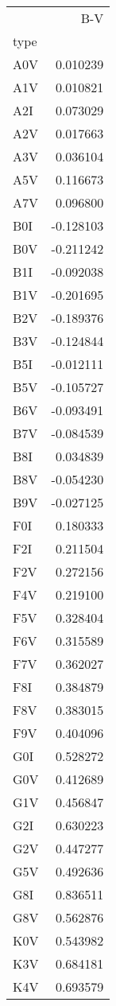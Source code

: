 \begin{tabular}{lr}
\toprule
{} &       B-V \\
type &           \\
\midrule
A0V  &  0.010239 \\
A1V  &  0.010821 \\
A2I  &  0.073029 \\
A2V  &  0.017663 \\
A3V  &  0.036104 \\
A5V  &  0.116673 \\
A7V  &  0.096800 \\
B0I  & -0.128103 \\
B0V  & -0.211242 \\
B1I  & -0.092038 \\
B1V  & -0.201695 \\
B2V  & -0.189376 \\
B3V  & -0.124844 \\
B5I  & -0.012111 \\
B5V  & -0.105727 \\
B6V  & -0.093491 \\
B7V  & -0.084539 \\
B8I  &  0.034839 \\
B8V  & -0.054230 \\
B9V  & -0.027125 \\
F0I  &  0.180333 \\
F2I  &  0.211504 \\
F2V  &  0.272156 \\
F4V  &  0.219100 \\
F5V  &  0.328404 \\
F6V  &  0.315589 \\
F7V  &  0.362027 \\
F8I  &  0.384879 \\
F8V  &  0.383015 \\
F9V  &  0.404096 \\
G0I  &  0.528272 \\
G0V  &  0.412689 \\
G1V  &  0.456847 \\
G2I  &  0.630223 \\
G2V  &  0.447277 \\
G5V  &  0.492636 \\
G8I  &  0.836511 \\
G8V  &  0.562876 \\
K0V  &  0.543982 \\
K3V  &  0.684181 \\
K4V  &  0.693579 \\

\end{tabular}
